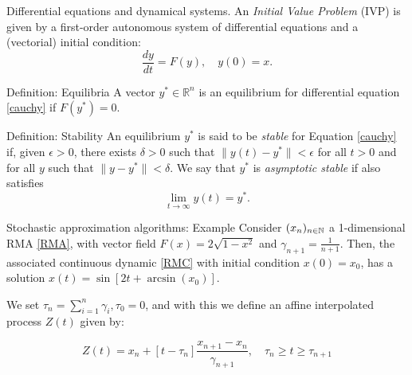 

\begin{frame}[c]{Differential equations and dynamical systems.}
An {\it Initial Value Problem} (IVP) is given by a first-order autonomous system of
differential equations and a (vectorial) initial condition:
\begin{equation}
\label{cauchy}
\frac{dy}{dt}= F(y),\quad y(0)=x.
\end{equation}



\begin{block}{Definition: Equilibria}
A vector $y^*\in\mathbb{R}^n$ is an equilibrium for differential equation \eqref{cauchy} if $F(y^*)=0$.
\end{block}


\begin{block}{Definition: Stability}
  An equilibrium $y^*$ is said to be {\it stable} for Equation
  \eqref{cauchy} if, given $\epsilon > 0$, there exists $\delta > 0$
  such that $\| y(t) - y^* \| < \epsilon$ for all $t > 0$ and for
  all $y$ such that $\|y - y^*\| < \delta$.
  We say that $y^*$ is {\it asymptotic stable} if  also satisfies \[
\lim_{t\to\infty}y(t)=y^*.
\] 
\end{block}

\end{frame}


\addtocounter{framenumber}{-1}
{
\begin{frame}[c]{Stochastic approximation algorithms: Example}
Consider $(x_n)_{n\in \mathbb{N}}$ a 1-dimensional RMA \eqref{RMA}, with vector field $F(x)=2\sqrt{1-x^2}$ and $\gamma_{n+1}=\frac{1}{n+1}$.
Then, the associated continuous dynamic \eqref{RMC} with initial condition $x(0)=x_0$, has a solution $x(t)=\sin[2t+\arcsin(x_0)]$. 

We set $\tau_n=\sum_{i=1}^n\gamma_i, \tau_0=0$, and with this we define an affine interpolated process $Z(t)$ given by:

\[Z(t)=x_n+[t-\tau_n]\frac{x_{n+1}-x_n}{\gamma_{n+1}},\quad \tau_n\geq t\geq \tau_{n+1} \]



\end{frame}
}


